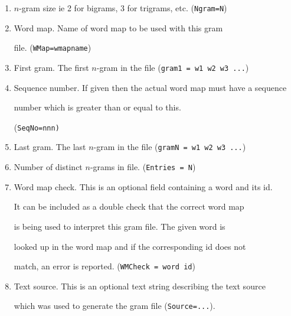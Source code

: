 \begin{enumerate}





\item $n$-gram size ie 2 for bigrams, 3 for trigrams, etc. (\texttt{Ngram=N})





\item Word map.  Name of word map to be used with this gram 


      file. (\texttt{WMap=wmapname})





\item First gram.  The first $n$-gram in the file (\texttt{gram1 = w1 w2 w3 ...})





\item Sequence number.  If given then the actual word map must have a sequence


      number which is greater than or equal to this.


      (\texttt{SeqNo=nnn)}





\item Last gram. The last $n$-gram in the file (\texttt{gramN = w1 w2 w3 ...})





\item Number of distinct $n$-grams in file.  (\texttt{Entries = N}) 





\item Word map check.  This is an optional field containing a word and its id.


      It can be included as a double check that the correct word map


      is being used to interpret this gram file.  The given word is


      looked up in the word map and if the corresponding id does not


      match, an error is reported.  (\texttt{WMCheck = word id})





\item Text source.  This is an optional text string describing the text source 


      which was used to generate the gram file (\texttt{Source=...}).





\end{enumerate}


